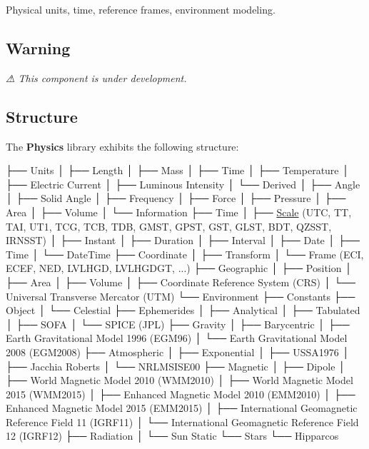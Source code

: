 Physical units, time, reference frames, environment modeling.

\href{https://travis-ci.com/open-space-collective/open-space-toolkit-physics}{\tt } \href{https://codecov.io/gh/open-space-collective/open-space-toolkit-physics}{\tt } \href{https://open-space-collective.github.io/open-space-toolkit-physics}{\tt } \href{https://badge.fury.io/gh/open-space-collective%2Fopen-space-toolkit-physics}{\tt } \href{https://badge.fury.io/py/open-space-toolkit-physics}{\tt } \href{https://opensource.org/licenses/Apache-2.0}{\tt }

\subsection*{Warning}

{\itshape ⚠ This component is under development.}

\subsection*{Structure}

The {\bfseries Physics} library exhibits the following structure\+:


\begin{DoxyCode}
├── Units
│   ├── Length
│   ├── Mass
│   ├── Time
│   ├── Temperature
│   ├── Electric Current
│   ├── Luminous Intensity
│   └── Derived
│       ├── Angle
│       ├── Solid Angle
│       ├── Frequency
│       ├── Force
│       ├── Pressure
│       ├── Area
│       ├── Volume
│       └── Information
├── Time
│   ├── \hyperlink{namespaceostk_1_1physics_1_1time_adf23d37bd8641fb76a0e98ab46a70df7}{Scale} (UTC, TT, TAI, UT1, TCG, TCB, TDB, GMST, GPST, GST, GLST, BDT, QZSST, IRNSST)
│   ├── Instant
│   ├── Duration
│   ├── Interval
│   ├── Date
│   ├── Time
│   └── DateTime
├── Coordinate
│   ├── Transform
│   └── Frame (ECI, ECEF, NED, LVLHGD, LVLHGDGT, ...)
├── Geographic
│   ├── Position
│   ├── Area
│   ├── Volume
│   ├── Coordinate Reference System (CRS)
│   └── Universal Transverse Mercator (UTM)
└── Environment
    ├── Constants
    ├── Object
    │   └── Celestial
    ├── Ephemerides
    │   ├── Analytical
    │   ├── Tabulated
    │   ├── SOFA
    │   └── SPICE (JPL)
    ├── Gravity
    │   ├── Barycentric
    │   ├── Earth Gravitational Model 1996 (EGM96)
    │   └── Earth Gravitational Model 2008 (EGM2008)
    ├── Atmospheric
    │   ├── Exponential
    │   ├── USSA1976
    │   ├── Jacchia Roberts
    │   └── NRLMSISE00
    ├── Magnetic
    │   ├── Dipole
    │   ├── World Magnetic Model 2010 (WMM2010)
    │   ├── World Magnetic Model 2015 (WMM2015)
    │   ├── Enhanced Magnetic Model 2010 (EMM2010)
    │   ├── Enhanced Magnetic Model 2015 (EMM2015)
    │   ├── International Geomagnetic Reference Field 11 (IGRF11)
    │   └── International Geomagnetic Reference Field 12 (IGRF12)
    ├── Radiation
    │   └── Sun Static
    └── Stars
        └── Hipparcos
\end{DoxyCode}



